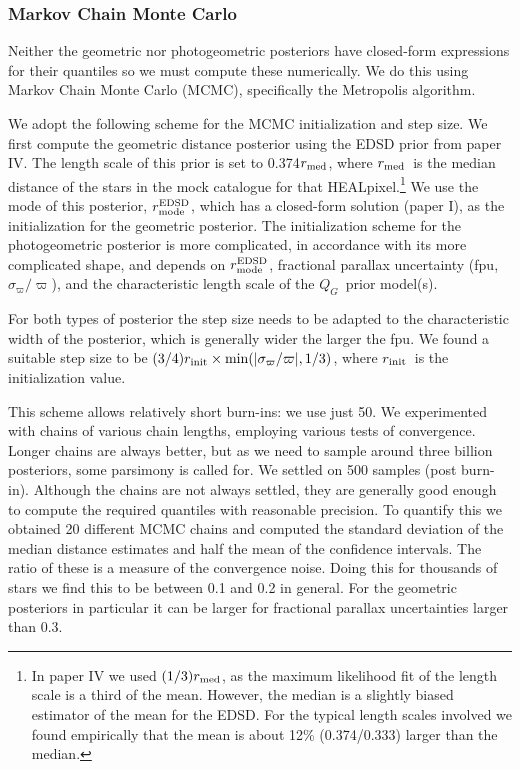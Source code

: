 \documentclass[twocolumn]{aastex62}
\providecommand{\QG}{\ensuremath{Q_G}}
\providecommand{\parallax}{\ensuremath{\varpi}}
\providecommand{\sigparallax}{\ensuremath{\sigma_{\varpi}}}
\providecommand{\fpu}{\ensuremath{\sigparallax/\parallax}}
\providecommand{\dist}{\ensuremath{r}}
\providecommand{\rmed}{\ensuremath{\dist_{\rm med}}}
\providecommand{\rEDSDmode}{\ensuremath{\dist^{\rm EDSD}_{\rm mode}}}
\providecommand{\rinit}{\ensuremath{\dist_{\rm init}}}
\begin{document}
\subsubsection{Markov Chain Monte Carlo}\label{sec:MCMC}

Neither the geometric nor photogeometric posteriors have closed-form expressions for their quantiles so we must compute these numerically.
We do this using Markov Chain Monte Carlo (MCMC), specifically the Metropolis algorithm. 

We adopt the following scheme for the MCMC initialization and step size.
We first compute the geometric distance posterior using the EDSD prior from paper IV. The length scale of this prior is set to 0.374\rmed, where \rmed\ is the median distance of the stars in the mock catalogue for that HEALpixel.\footnote{In paper IV we used $(1/3)\rmed$, as the maximum likelihood fit of the length scale is a third of the mean. However, the median is a slightly biased estimator of the mean for the EDSD. For the typical length scales involved we found empirically that the mean is about 12\% (0.374/0.333) larger than the median.} We use the mode of this posterior, \rEDSDmode, which has a closed-form solution (paper I), as the initialization for the geometric posterior. 
The initialization scheme for the photogeometric posterior is more complicated, in accordance with its more complicated shape, and depends on \rEDSDmode, fractional parallax uncertainty (fpu, \fpu), and the characteristic length scale of the \QG\ prior model(s). 

For both types of posterior the step size needs to be adapted to the characteristic width of the posterior, which is generally wider the larger the fpu.
We found a suitable step size to be
$(3/4)\rinit\times \min(|\sigparallax/\parallax|, 1/3)$, where \rinit\ is the initialization value.

This scheme allows relatively short burn-ins: we use just 50. We experimented with chains of various chain lengths, employing various tests of convergence. Longer chains are always better, but as we need to sample around three billion posteriors, some parsimony is called for.  We settled on 500 samples (post burn-in).  Although the chains are not always settled, they are generally good enough to compute the required quantiles with reasonable precision. To quantify this we obtained 20 different MCMC chains %
and computed the standard deviation of the median distance estimates and half the mean of the confidence intervals. The ratio of these is a measure of the convergence noise. Doing this for thousands of stars we find this to be between 0.1 and 0.2 in general. For the geometric posteriors in particular it can be larger for fractional parallax uncertainties larger than 0.3.
\end{document}
